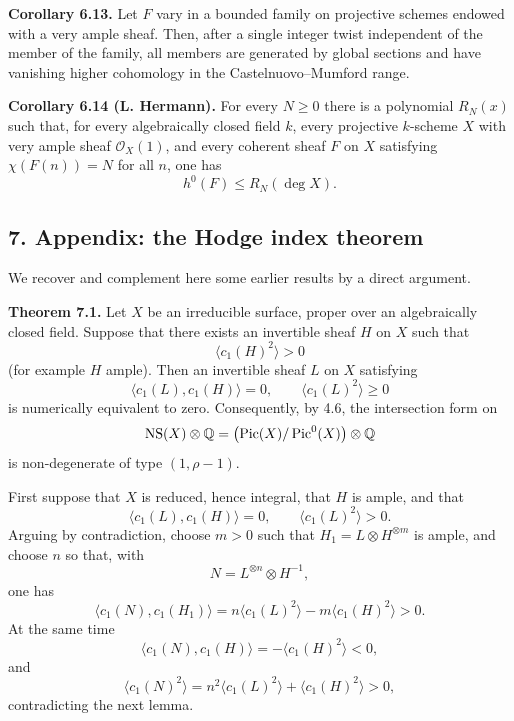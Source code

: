 \documentclass[11pt]{article}
\providecommand{\Pic}{\operatorname{Pic}}
\providecommand{\Q}{\mathbb Q}
\begin{document}
\textbf{Corollary 6.13.} Let $F$ vary in a bounded family on projective schemes endowed with a very ample sheaf. Then, after a single integer twist independent of the member of the family, all members are generated by global sections and have vanishing higher cohomology in the Castelnuovo--Mumford range.

\textbf{Corollary 6.14 (L. Hermann).} For every $N\ge0$ there is a polynomial $R_N(x)$ such that, for every algebraically closed field $k$, every projective $k$-scheme $X$ with very ample sheaf $\mathcal O_X(1)$, and every coherent sheaf $F$ on $X$ satisfying $\chi(F(n))=N$ for all $n$, one has
\[
   h^0(F)\le R_N(\deg X).
\]

\subsection*{7. Appendix: the Hodge index theorem}

We recover and complement here some earlier results by a direct argument.

\textbf{Theorem 7.1.} Let $X$ be an irreducible surface, proper over an algebraically closed field. Suppose that there exists an invertible sheaf $H$ on $X$ such that
\[
   \langle c_1(H)^2\rangle>0
\]
(for example $H$ ample). Then an invertible sheaf $L$ on $X$ satisfying
\[
   \langle c_1(L),c_1(H)\rangle=0,
   \qquad
   \langle c_1(L)^2\rangle\ge0
\]
is numerically equivalent to zero. Consequently, by 4.6, the intersection form on
\[
   \NS(X)\otimes\Q=\bigl(\Pic(X)/\Pic^0(X)\bigr)\otimes\Q
\]
is non-degenerate of type $(1,\rho-1)$.

First suppose that $X$ is reduced, hence integral, that $H$ is ample, and that
\[
   \langle c_1(L),c_1(H)\rangle=0,
   \qquad
   \langle c_1(L)^2\rangle>0.
\]
Arguing by contradiction, choose $m>0$ such that $H_1=L\otimes H^{\otimes m}$ is ample, and choose $n$ so that, with
\[
   N=L^{\otimes n}\otimes H^{-1},
\]
one has
\[
   \langle c_1(N),c_1(H_1)\rangle
   =n\langle c_1(L)^2\rangle-m\langle c_1(H)^2\rangle>0.
\]
At the same time
\[
   \langle c_1(N),c_1(H)\rangle=-\langle c_1(H)^2\rangle<0,
\]
and
\[
   \langle c_1(N)^2\rangle=n^2\langle c_1(L)^2\rangle+\langle c_1(H)^2\rangle>0,
\]
contradicting the next lemma.
\end{document}
